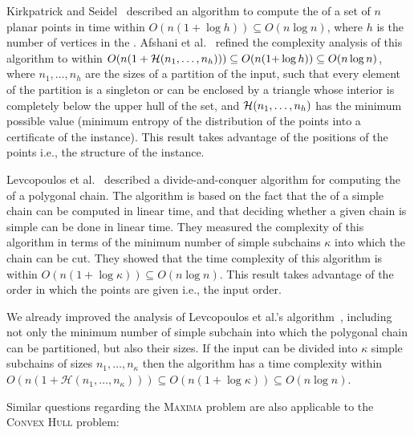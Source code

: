 Kirkpatrick and
Seidel~\cite{1986-JCom-TheUltimatePlanarConvexHullAlgorithm-KirkpatrickSeidel}
described an algorithm to compute the {} of a set of
$n$ planar points in time within $O(n(1+\log h))\subseteq O(n\log n)$,
where $h$ is the number of vertices in the {}. Afshani
et
al.~\cite{2009-FOCS-InstanceOptimalGeometricAlgorithms-AfshaniBarbayChan}
refined the complexity analysis of this algorithm to within
$O(n(1+{\cal H}(n_1,\ldots,n_h)))\subseteq O(n(1{+}\log h)) \subseteq
O(n\log{n})$, where $n_1, \dots, n_h$ are the sizes of a partition of
the input, such that every element of the partition is a singleton or
can be enclosed by a triangle whose interior is completely below the
upper hull of the set, and ${\cal H}(n_1,\ldots,n_h)$ has the minimum
possible value (minimum entropy of the distribution of the points into
a certificate of the instance). This result takes advantage of the
positions of the points i.e., the structure of the instance.

Levcopoulos et
al.~\cite{2002-SWAT-AdaptiveAlgorithmsForConstructingConvexHullsAndTriangulationsOfPolygonalChains-LevcopoulosLingasMitchell}
described a divide-and-conquer algorithm for computing the {} of a polygonal chain. The algorithm is based on the fact
that the {} of a simple chain can be computed in
linear time, and that deciding whether a given chain is simple can be
done in linear time. They measured the complexity of this algorithm in
terms of the minimum number of simple subchains $\kappa$ into which
the chain can be cut. They showed that the time complexity of this
algorithm is within $O(n(1{+}\log{\kappa})) \subseteq O(n\log{n})$.
%
This result takes advantage of the order in which the points are given i.e., the input order.

We already improved the analysis of Levcopoulos et al.'s
algorithm~\cite{2002-SWAT-AdaptiveAlgorithmsForConstructingConvexHullsAndTriangulationsOfPolygonalChains-LevcopoulosLingasMitchell},
including not only the minimum number of simple subchain into which
the polygonal chain can be partitioned, but also their sizes. If the
input can be divided into $\kappa$ simple subchains of sizes
$n_1, \dots, n_{\kappa}$ then the algorithm has a time complexity
within
$O(n(1+\mathcal{H}(n_1, \dots, n_{\kappa}))) \subseteq
O(n(1{+}\log{\kappa})) \subseteq O(n\log{n})$.

Similar questions regarding the \textsc{Maxima} problem are also
applicable to the \textsc{Convex Hull} problem:

